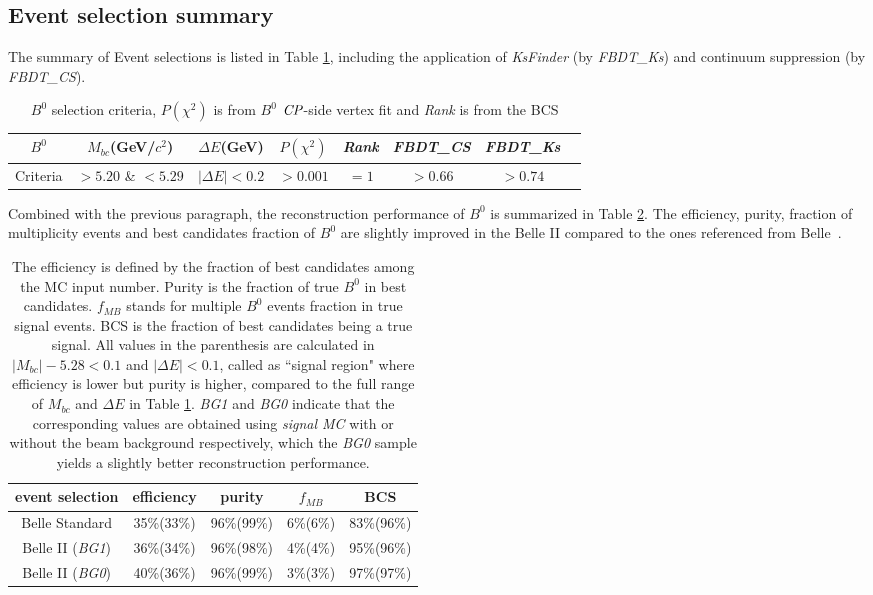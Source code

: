\subsection{Event selection summary}
The summary of Event selections is listed in Table \ref{tab:b0select}, including the application of \textit{KsFinder} (by \textit{FBDT\_Ks}) and continuum suppression (by \textit{FBDT\_CS}).
\begin{table}[htpb]
	\centering 
	\begin{tabular}{c|c|c|c|c|c|c|c} 
		\hline
		$B^0$  & $M_{bc}$(GeV/$c^2$)& $\Delta E$(GeV) & $P(\chi^2)$ & \textit{Rank} & \textit{FBDT\_CS} & \textit{FBDT\_Ks}\\
		\hline
		Criteria & $> 5.20$ \& $< 5.29$  &  $ |\Delta E|< 0.2$ & $> 0.001$  & $=1$ & $>0.66$ & $>0.74$\\
		\hline
	\end{tabular}
	\caption{$B^0$ selection criteria, $P(\chi^2)$ is from $B^0$ $\it{CP}$-side vertex fit and \textit{Rank} is from the BCS}
	\label{tab:b0select}
\end{table}

Combined with the previous paragraph, the reconstruction performance of $B^0$ is summarized in Table \ref{tab:b0stats}. The efficiency, purity, fraction of multiplicity events and best candidates fraction of $B^0$ are slightly improved in the Belle II compared to the ones referenced from Belle~\cite{kang2020measurement}.
\begin{table}[H]
	\centering
	\begin{tabular}{c|c|c|c|c}
		\hline
		event selection & efficiency & purity  & $f_{MB}$  & BCS \\
		\hline
		\hline
		Belle Standard & 35\%(33\%) & 96\%(99\%) & 6\%(6\%) & 83\%(96\%)\\
		\hline 
		Belle II (\textit{BG1}) & 36\%(34\%) & 96\%(98\%) & 4\%(4\%) & 95\%(96\%)\\
		\hline
		Belle II (\textit{BG0}) & 40\%(36\%) & 96\%(99\%) & 3\%(3\%) & 97\%(97\%)\\
		\hline
	\end{tabular}
	\caption{The efficiency is defined by the fraction of best candidates among the MC input number. Purity is the fraction of true $B^0$ in best candidates. $f_{MB}$ stands for multiple $B^0$ events fraction in true signal events. BCS is the fraction of best candidates being a true signal. All values in the parenthesis are calculated in $| M_{bc} |- 5.28 < 0.1$ and $|\Delta E| < 0.1$, called as ``signal region" where efficiency is lower but purity is higher, compared to the full range of $M_{bc}$ and $\Delta E$ in Table \ref{tab:b0select}. \textit{BG1} and \textit{BG0} indicate that the corresponding values are obtained using \textit{signal MC} with or without the beam background respectively, which the \textit{BG0} sample yields a slightly better reconstruction performance. }
	\label{tab:b0stats}
\end{table}


